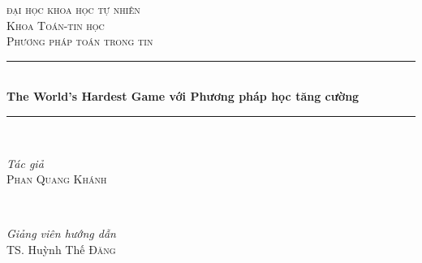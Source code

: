 \documentclass[12pt,a4paper]{article}
\begin{document}

\begin{titlepage} %
	\newcommand{\HRule}{\rule{\linewidth}{0.5mm}} %
	
	\center %
	
	
	\textsc{\LARGE đại học khoa học tự nhiên}\\[1.5cm] 
	\textsc{\Large Khoa Toán-tin học}\\[0.5cm] 
	
	\textsc{\large Phương pháp toán trong tin}\\[0.5cm] 
	
	
	\HRule\\[0.4cm]
	
	{\huge\bfseries The World's Hardest Game với Phương pháp học tăng cường}\\[0.4cm] %
	
	\HRule\\[1.5cm]
	
	
	\begin{minipage}{0.4\textwidth}
		\begin{flushleft}
			\large
			\textit{Tác giả}\\
			\textsc{Phan Quang Khánh} %
		\end{flushleft}
	\end{minipage}
	~
	\begin{minipage}{0.4\textwidth}
		\begin{flushright}
			\large
			\textit{Giảng viên hướng dẫn}\\
			TS. Huỳnh Thế \textsc{Đăng} %
		\end{flushright}
	\end{minipage}
	

\end{titlepage}
\end{document}
